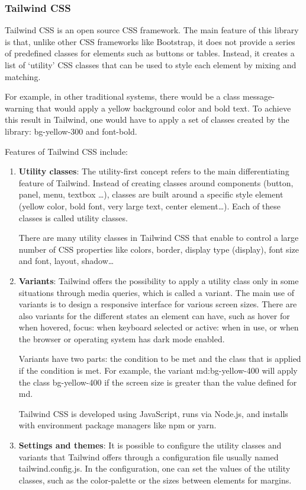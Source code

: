 \subsubsection{Tailwind CSS}
Tailwind CSS is an open source CSS framework. The main feature of this library is that, unlike other CSS frameworks like Bootstrap, it does not provide a series of predefined classes for elements such as buttons or tables. Instead, it creates a list of `utility' CSS classes that can be used to style each element by mixing and matching.\cite{enwiki:1206918069}

For example, in other traditional systems, there would be a class message-warning that would apply a yellow background color and bold text. To achieve this result in Tailwind, one would have to apply a set of classes created by the library: bg-yellow-300 and font-bold.\cite{enwiki:1206918069}

Features of Tailwind CSS include:
\begin{enumerate}
  \item \textbf{Utility classes}: The utility-first concept refers to the main differentiating feature of Tailwind. Instead of creating classes around components (button, panel, menu, textbox \ldots), classes are built around a specific style element (yellow color, bold font, very large text, center element\ldots). Each of these classes is called utility classes.
  
  There are many utility classes in Tailwind CSS that enable to control a large number of CSS properties like colors, border, display type (display), font size and font, layout, shadow\ldots\cite{enwiki:1206918069}
  \item \textbf{Variants}: Tailwind offers the possibility to apply a utility class only in some situations through media queries, which is called a variant. The main use of variants is to design a responsive interface for various screen sizes. There are also variants for the different states an element can have, such as hover \: for when hovered, focus: when keyboard selected or active: when in use, or when the browser or operating system has dark mode enabled.\cite{enwiki:1206918069}

  Variants have two parts: the condition to be met and the class that is applied if the condition is met. For example, the variant md:bg-yellow-400 will apply the class bg-yellow-400 if the screen size is greater than the value defined for md.\cite{enwiki:1206918069}
  
  Tailwind CSS is developed using JavaScript, runs via Node.js, and installs with environment package managers like npm or yarn.\cite{enwiki:1206918069}
  \item \textbf{Settings and themes}: It is possible to configure the utility classes and variants that Tailwind offers through a configuration file usually named tailwind.config.js. In the configuration, one can set the values of the utility classes, such as the color-palette or the sizes between elements for margins.\cite{enwiki:1206918069}
\end{enumerate}

